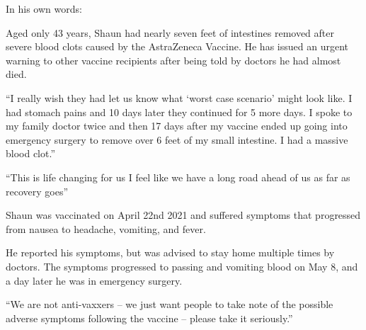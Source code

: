 In his own words:

Aged only 43 years, Shaun had nearly seven feet of intestines removed after
severe blood clots caused by the AstraZeneca Vaccine. He has issued an urgent
warning to other vaccine recipients after being told by doctors he had almost
died.

“I really wish they had let us know what ‘worst case scenario’ might look
like. I had stomach pains and 10 days later they continued for 5 more days. I
spoke to my family doctor twice and then 17 days after my vaccine ended up going
into emergency surgery to remove over 6 feet of my small intestine. I had a
massive blood clot.”

“This is life changing for us I feel like we have a long road ahead of us as far
as recovery goes”

Shaun was vaccinated on April 22nd 2021 and suffered symptoms that progressed
from nausea to headache, vomiting, and fever.

He reported his symptoms, but was advised to stay home multiple times by
doctors. The symptoms progressed to passing and vomiting blood on May 8, and a
day later he was in emergency surgery.

“We are not anti-vaxxers – we just want people to take note of the possible
adverse symptoms following the vaccine – please take it seriously.”

